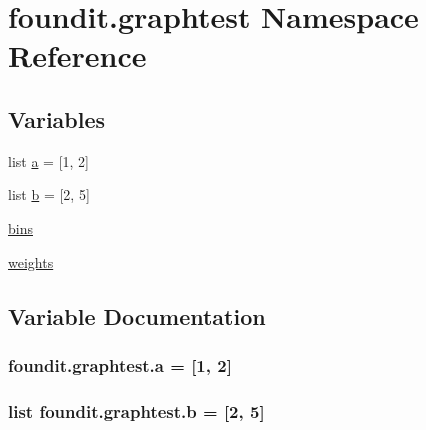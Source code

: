 \hypertarget{namespacefoundit_1_1graphtest}{}\section{foundit.\+graphtest Namespace Reference}
\label{namespacefoundit_1_1graphtest}
\subsection*{Variables}
\begin{DoxyCompactItemize}
\item 
list \hyperlink{namespacefoundit_1_1graphtest_a598db4fa9693ae9cc94d8ebe41d59224}{a} = \mbox{[}1, 2\mbox{]}
\item 
list \hyperlink{namespacefoundit_1_1graphtest_add8d87bd6a6890fe6f2682f0f7990ed9}{b} = \mbox{[}2, 5\mbox{]}
\item 
\hyperlink{namespacefoundit_1_1graphtest_aae9ec7ea98940dc46b73c2908419e44c}{bins}
\item 
\hyperlink{namespacefoundit_1_1graphtest_a0717e136db67aedb0ff4cffd4fc30c5f}{weights}
\end{DoxyCompactItemize}


\subsection{Variable Documentation}
\subsubsection[{\texorpdfstring{a}{a}}]{\setlength{\rightskip}{0pt plus 5cm}foundit.\+graphtest.\+a = \mbox{[}1, 2\mbox{]}}\hypertarget{namespacefoundit_1_1graphtest_a598db4fa9693ae9cc94d8ebe41d59224}{}\label{namespacefoundit_1_1graphtest_a598db4fa9693ae9cc94d8ebe41d59224}
\subsubsection[{\texorpdfstring{b}{b}}]{\setlength{\rightskip}{0pt plus 5cm}list foundit.\+graphtest.\+b = \mbox{[}2, 5\mbox{]}}\hypertarget{namespacefoundit_1_1graphtest_add8d87bd6a6890fe6f2682f0f7990ed9}{}\label{namespacefoundit_1_1graphtest_add8d87bd6a6890fe6f2682f0f7990ed9}
